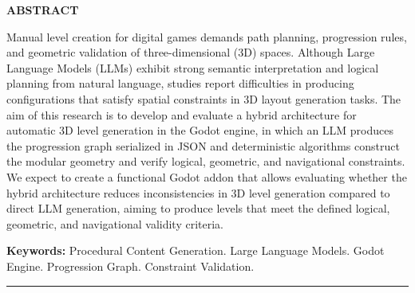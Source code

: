 \documentclass[
  12pt,
  a4paper,
  oneside,
  article,
  brazil
]{abntex2}
\begin{document}
{\centering\textbf{ABSTRACT}\par}
\vspace{0.05cm}
\begin{SingleSpace}
\noindent
Manual level creation for digital games demands path planning, progression rules, and geometric validation of three-dimensional (3D) spaces. Although Large Language Models (LLMs) exhibit strong semantic interpretation and logical planning from natural language, studies report difficulties in producing configurations that satisfy spatial constraints in 3D layout generation tasks. The aim of this research is to develop and evaluate a hybrid architecture for automatic 3D level generation in the Godot engine, in which an LLM produces the progression graph serialized in JSON and deterministic algorithms construct the modular geometry and verify logical, geometric, and navigational constraints. We expect to create a functional Godot addon that allows evaluating whether the hybrid architecture reduces inconsistencies in 3D level generation compared to direct LLM generation, aiming to produce levels that meet the defined logical, geometric, and navigational validity criteria.

\vspace{0.05cm}
\noindent\textbf{Keywords:} Procedural Content Generation. Large Language Models. Godot Engine. Progression Graph. Constraint Validation.\\[-4pt]
\noindent\rule{\linewidth}{1pt}
\end{SingleSpace}






\clearpage
\SingleSpacing
\printbibliography[title={Referências}]
\end{document}
